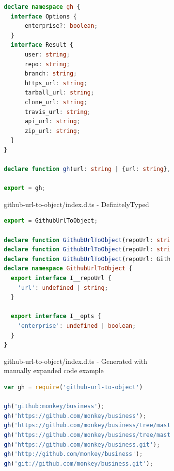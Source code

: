 \documentclass[english,cleveref,autoref,submission]{programming}
\begin{document}
\begin{figure}[tp]
  \centering
  \begin{subfigure}{0.80\linewidth}
    \begin{lstlisting}[language=TypeScript]
declare namespace gh {
  interface Options {
      enterprise?: boolean;
  }
  interface Result {
      user: string;
      repo: string;
      branch: string;
      https_url: string;
      tarball_url: string;
      clone_url: string;
      travis_url: string;
      api_url: string;
      zip_url: string;
  }
}

declare function gh(url: string | {url: string}, options?: gh.Options): gh.Result | null;

export = gh;    
    \end{lstlisting}
    \caption{github-url-to-object/index.d.ts - DefinitelyTyped}
  \end{subfigure}

  \begin{subfigure}{0.80\linewidth}
    \begin{lstlisting}[language=TypeScript]
export = GithubUrlToObject;

declare function GithubUrlToObject(repoUrl: string|GithubUrlToObject.I__repoUrl, opts: undefined): object;
declare function GithubUrlToObject(repoUrl: string|GithubUrlToObject.I__repoUrl, opts: GithubUrlToObject.I__opts): null|object;
declare function GithubUrlToObject(repoUrl: GithubUrlToObject.I__repoUrl, opts: undefined): object;
declare namespace GithubUrlToObject {
  export interface I__repoUrl {
    'url': undefined | string;
  }

  export interface I__opts {
    'enterprise': undefined | boolean;
  }
}
    \end{lstlisting}
    \caption{github-url-to-object/index.d.ts - Generated with manually expanded code example}
  \end{subfigure}

  \begin{subfigure}{0.80\linewidth}
    \begin{lstlisting}[language=JavaScript]
var gh = require('github-url-to-object')

gh('github:monkey/business');
gh('https://github.com/monkey/business');
gh('https://github.com/monkey/business/tree/master');
gh('https://github.com/monkey/business/tree/master/nested/file.js');
gh('https://github.com/monkey/business.git');
gh('http://github.com/monkey/business');
gh('git://github.com/monkey/business.git');


\end{lstlisting}
\end{subfigure}
\end{figure}
\end{document}
